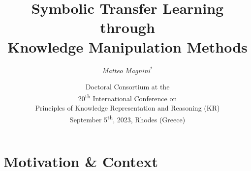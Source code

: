 \documentclass[presentation]{beamer}\mode<presentation>{\usetheme{blackAMSBolognaFC}}
\title[Symbolic Transfer Learning]{
    \textbf{Symbolic Transfer Learning through}
    \\
    \textbf{Knowledge Manipulation Methods}
}
\author[Magnini]{
	\emph{Matteo Magnini}$^{*}$ %
}
\institute[UniBo]{
    $^{*}$Dipartimento di Informatica -- Scienza e Ingegneria (DISI)
    \\
    \textsc{Alma Mater Studiorum} -- Università di Bologna
    \\
    \texttt{
        \emph{matteo.magnini}@unibo.it %
    }
}
\date[DC KR 2023]{
	Doctoral Consortium at the
    \\
    20\textsuperscript{th} International Conference on
	\\
	Principles of Knowledge Representation and Reasoning (KR)
	\\
	September 5\textsuperscript{th}, 2023, Rhodes (Greece)
}
\begin{document}

\frame{\titlepage}

\section{Motivation \& Context}
\end{document}

